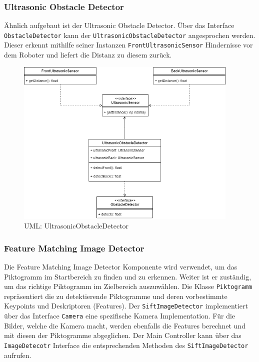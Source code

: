 \subsubsection{Ultrasonic Obstacle Detector}
Ähnlich aufgebaut ist der Ultrasonic Obstacle Detector. Über das Interface \texttt{ObstacleDetector} kann der \texttt{UltrasonicObstacleDetector} angesprochen werden. Dieser erkennt mithilfe seiner Instanzen \texttt{FrontUltrasonicSensor} Hindernisse vor dem Roboter und liefert die Distanz zu diesem zurück.
\begin{figure}[H]
  \includegraphics[width=0.95\textwidth]{img/softwarearchitektur/UML-UltrasonicObstacleDetector.png}
  \centering
  \caption{UML: UltrasonicObstacleDetector}
  \label{fig:uml-ultrasonic-obstacle-detector}
\end{figure}

\subsubsection{Feature Matching Image Detector}
\label{sec:architecture-feature-matching}
Die Feature Matching Image Detector Komponente wird verwendet, um das Piktogramm im Startbereich zu finden und zu erkennen. Weiter ist er zuständig, um das richtige Piktogramm im Zielbereich auszuwählen. 
Die Klasse \texttt{Piktogramm} repräsentiert die zu detektierende Piktogramme und deren vorbestimmte Keypoints und Deskriptoren (Features). Der \texttt{SiftImageDetector} implementiert über das Interface \texttt{Camera} eine spezifische Kamera Implementation. Für die Bilder, welche die Kamera macht, werden ebenfalls die Features berechnet und mit diesen der Piktogramme abgeglichen. Der Main Controller kann über das \texttt{ImageDetecotr} Interface die entsprechenden Methoden des \texttt{SiftImageDetector} aufrufen.

